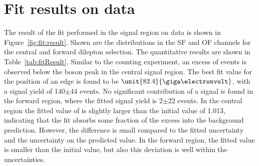 \section{Fit results on data}
The result of the fit performed in the signal region on data is shown in Figure~\ref{fig:fit:result}. Shown are the \mll distributions in the SF and OF channels for the central and forward dilepton selection. The quantitative results are shown in Table~\ref{tab:fitResult}. Similar to the counting experiment, an excess of events is observed below the \Z boson peak in the central signal region. The best fit value for the position of an edge is found to be $\unit{82.4}{\giga\electronvolt}$, with a signal yield of 140$\pm$44 events. No significant contribution of a signal is found in the forward region, where the fitted signal yield is 2$\pm$22 events. In the central region the fitted value of \Rsfof is slightly larger than the initial value of 1.013, indicating that the fit absorbs some fraction of the excess into the background prediction. However, the difference is small compared to the fitted uncertainty and the uncertainty on the predicted value. In the forward region, the fitted value is smaller than the initial value, but also this deviation is well within the uncertainties. 


